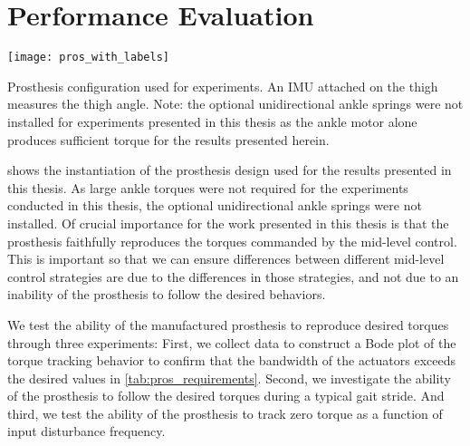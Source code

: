 \section{Performance Evaluation}\label{sec:pros_perf_eval}

\begin{marginfigure}[-1in]
\centerline{\texttt{[image: pros\_with\_labels]}}
\caption[Prosthesis configuration used for experiments]{Prosthesis configuration
used for experiments. An IMU attached on the thigh measures the thigh angle.
Note: the optional unidirectional ankle springs were not installed for
experiments presented in this thesis as the ankle motor alone produces
sufficient torque for the results presented
herein.}\label{fig:prosthesis_actual}
\end{marginfigure}

 shows the instantiation of the prosthesis design
used for the results presented in this thesis. As large ankle torques were not
required for the experiments conducted in this thesis, the optional
unidirectional ankle springs were not installed. Of crucial importance for the
work presented in this thesis is that the prosthesis faithfully reproduces the
torques commanded by the mid-level control. This is important so that we can
ensure differences between different mid-level control strategies are due to the
differences in those strategies, and not due to an inability of the prosthesis
to follow the desired behaviors.

We test the ability of the manufactured prosthesis to reproduce desired torques
through three experiments: First, we collect data to construct a Bode plot of
the torque tracking behavior to confirm that the bandwidth of the actuators
exceeds the desired values in \cref{tab:pros_requirements}. Second, we
investigate the ability of the prosthesis to follow the desired torques during a
typical gait stride. And third, we test the ability of the prosthesis to track
zero torque as a function of input disturbance frequency.

